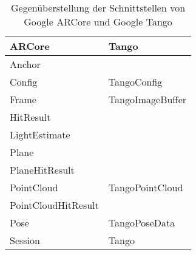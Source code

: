 \begin{table}[h]
	\centering
	\begin{tabular}{|p{4cm}|p{4cm}|}
		\hline
		\textbf{ARCore} & \textbf{Tango}\\
		\hline
		Anchor & \\
		Config & TangoConfig\\
		Frame & TangoImageBuffer\\
		HitResult & \\
		LightEstimate & \\
		Plane & \\
		PlaneHitResult & \\
		PointCloud & TangoPointCloud\\
		PointCloudHitResult & \\
		Pose & TangoPoseData\\
		Session & Tango\\
		\hline
	\end{tabular}
	\caption{Gegenüberstellung der Schnittstellen von Google ARCore und Google Tango}
	\label{arcore_vs_tango}
\end{table}
